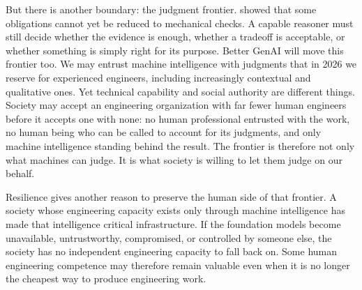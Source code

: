 
But there is another boundary: the judgment frontier.  showed that some obligations cannot yet be reduced to mechanical checks. A capable reasoner must still decide whether the evidence is enough, whether a tradeoff is acceptable, or whether something is simply right for its purpose. Better GenAI will move this frontier too. We may entrust machine intelligence with judgments that in 2026 we reserve for experienced engineers, including increasingly contextual and qualitative ones. Yet technical capability and social authority are different things. Society may accept an engineering organization with far fewer human engineers before it accepts one with none: no human professional entrusted with the work, no human being who can be called to account for its judgments, and only machine intelligence standing behind the result. The frontier is therefore not only what machines can judge. It is what society is willing to let them judge on our behalf.


Resilience gives another reason to preserve the human side of that frontier. A society whose engineering capacity exists only through machine intelligence has made that intelligence critical infrastructure. If the foundation models become unavailable, untrustworthy, compromised, or controlled by someone else, the society has no independent engineering capacity to fall back on. Some human engineering competence may therefore remain valuable even when it is no longer the cheapest way to produce engineering work.

